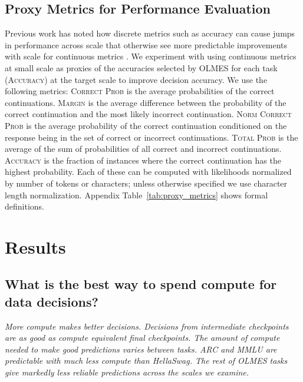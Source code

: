 \documentclass{article}
\theoremstyle{plain}
\theoremstyle{definition}
\theoremstyle{remark}
\newcommand{\olmes}{OLMES}
\newcommand{\arc}{ARC}
\newcommand{\hellaswag}{HellaSwag}
\newcommand{\mmlu}{MMLU}
\newcommand{\correctProb}{\textsc{Correct Prob}}
\newcommand{\margin}{\textsc{Margin}}
\newcommand{\normCorrectProb}{\textsc{Norm Correct Prob}}
\newcommand{\primaryMetric}{\textsc{Accuracy}}
\newcommand{\totalProb}{\textsc{Total Prob}}
\newcommand{\accRaw}{\textsc{Accuracy}}
\newcommand{\twoClass}{decision accuracy}
\begin{document}
\subsection{Proxy Metrics for Performance Evaluation}
\label{sec:proxy_metrics}
Previous work has noted how discrete metrics such as accuracy can cause jumps in performance across scale that otherwise see more predictable improvements with scale for continuous metrics \citep{schaeffer2023emergentabilitieslargelanguage}.
We experiment with using continuous metrics at small scale as proxies of the accuracies selected by \olmes{} for each task (\primaryMetric{}) at the target scale to improve \twoClass{}. We use the following metrics: \correctProb{} is the average probabilities of the correct continuations. \margin{} is the average  difference between the probability of the correct continuation and the most likely incorrect continuation. \normCorrectProb{} is the average probability of the correct continuation conditioned on the response being in the set of correct or incorrect continuations. \totalProb{} is the average of the sum of probabilities of all correct and incorrect continuations. \accRaw{} is the fraction of instances where the correct continuation has the highest probability. Each of these can be computed with likelihoods normalized by number of tokens or characters; unless otherwise specified we use character length normalization. Appendix Table~\ref{tab:proxy_metrics} shows formal definitions.

\section{Results}

\subsection{What is the best way to spend compute for data decisions?}
\label{sec:compute_story}
\begin{tcolorbox}[colback=yellow!10!white, colframe=yellow!50!white, boxrule=0pt, sharp corners, width=\linewidth]
\textit{More compute makes better decisions. Decisions from intermediate checkpoints are as good as compute equivalent final checkpoints. The amount of compute needed to make good predictions varies between tasks. \arc{} and \mmlu{} are predictable with much less compute than \hellaswag{}. The rest of \olmes{} tasks give markedly less reliable predictions across the scales we examine.}
\end{tcolorbox}
\end{document}
